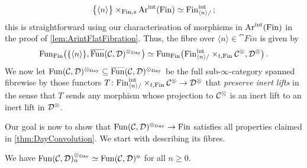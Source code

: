 \begin{con}
	 \begin{equation*}
	 	\bigl\{\langle n\rangle \bigr\}\times_{\mathrm{Fin},s}\operatorname{Ar}^\mathrm{int}(\mathrm{Fin})\simeq \mathrm{Fin}^{\mathrm{int}}_{\langle n\rangle /}\,;
	 \end{equation*}
	 this is straightforward using our characterisation of morphisms in $\operatorname{Ar}^\mathrm{int}(\mathrm{Fin})$ in the proof of \cref{lem:ArintFlatFibration}. Thus, the fibre over $\langle n\rangle \in\cat{Fin}$ is given by
	 \begin{equation*}
	 	\Fun_{\cat{Fin}}\bigl(\{\langle n\rangle\},\ov{\Fun}(\Cc,\Dd)^{\otimes_{\mathrm{Day}}}\bigr)\simeq \Fun_{\cat{Fin}}\bigl(\cat{Fin}^\mathrm{int}_{\langle n\rangle/}\times_{t,\cat{Fin}}\Cc^\otimes,\Dd^\otimes\bigr)\,.
	 \end{equation*}
	 We now let $\Fun(\Cc,\Dd)^{\otimes_{\mathrm{Day}}}\subseteq \ov{\Fun}(\Cc,\Dd)^{\otimes_{\mathrm{Day}}}$ be the full sub-$\infty$-category spanned fibrewise by those functors $T\colon \mathrm{Fin}^\mathrm{int}_{\langle n\rangle/}\times_{t,\mathrm{Fin}}\mathcal{C}^\otimes\rightarrow\mathcal{D}^\otimes$ that \emph{preserve inert lifts} in the sense that $T$ sends any morphism whose projection to $\mathcal{C}^\otimes$ is an inert lift to an inert lift in $\mathcal{D}^\otimes$.
\end{con}
Our goal is now to show that $\operatorname{Fun}(\mathcal{C},\mathcal{D})^{\otimes_{\mathrm{Day}}}\rightarrow \mathrm{Fin}$ satisfies all properties claimed in \cref{thm:DayConvolution}. We start with describing its fibres.
\begin{lem}\label{lem:DayConvolutionFibres}
	We have $\operatorname{Fun}(\mathcal{C},\mathcal{D})^{\otimes_{\mathrm{Day}}}_n\simeq \operatorname{Fun}(\mathcal{C},\mathcal{D})^n$ for all $n\geqslant 0$.
\end{lem}
